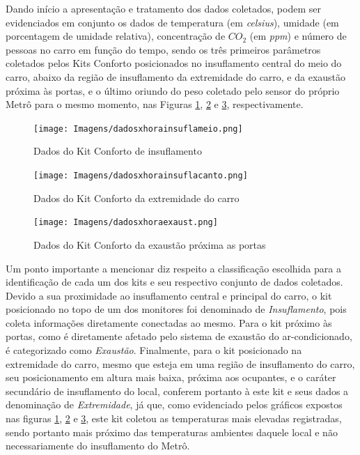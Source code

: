 \documentclass[acronym,symbols,table]{fei}
\begin{document}
Dando início a apresentação e tratamento dos dados coletados, podem ser evidenciados em conjunto os dados de temperatura (em \textit{celsius}), umidade (em porcentagem de umidade relativa), concentração de ${CO}_{2}$ (em \textit{ppm}) e número de pessoas no carro em função do tempo, sendo os três primeiros parâmetros coletados pelos Kits Conforto posicionados no insuflamento central do meio do carro, abaixo da região de insuflamento da extremidade do carro, e da exaustão próxima às portas, e o último oriundo do peso coletado pelo sensor do próprio Metrô para o mesmo momento, nas Figuras \ref{fig:dadosTV}, \ref{fig:dadosjanela} e \ref{fig:dadosporta}, respectivamente.

\begin{figure}[!htb]
    \centering
    \caption{Dados do Kit Conforto de insuflamento}
    \texttt{[image: Imagens/dadosxhorainsuflameio.png]}
    \label{fig:dadosTV}
\end{figure}

\begin{figure}[!htb]
    \centering
    \caption{Dados do Kit Conforto da extremidade do carro}
    \texttt{[image: Imagens/dadosxhorainsuflacanto.png]}
    \label{fig:dadosjanela}
\end{figure}

\begin{figure}[!htb]
    \centering
    \caption{Dados do Kit Conforto da exaustão próxima as portas}
    \texttt{[image: Imagens/dadosxhoraexaust.png]}
    \label{fig:dadosporta}
\end{figure}

\newpage

Um ponto importante a mencionar diz respeito a classificação escolhida para a identificação de cada um dos kits e seu respectivo conjunto de dados coletados. Devido a sua proximidade ao insuflamento central e principal do carro, o kit posicionado no topo de um dos monitores foi denominado de \textit{Insuflamento}, pois coleta informações diretamente conectadas ao mesmo. Para o kit próximo às portas, como é diretamente afetado pelo sistema de exaustão do ar-condicionado, é categorizado como \textit{Exaustão}. Finalmente, para o kit posicionado na extremidade do carro, mesmo que esteja em uma região de insuflamento do carro, seu posicionamento em altura mais baixa, próxima aos ocupantes, e o caráter secundário de insuflamento do local, conferem portanto à este kit e seus dados a denominação de \textit{Extremidade}, já que, como evidenciado pelos gráficos expostos nas figuras \ref{fig:dadosTV}, \ref{fig:dadosjanela} e \ref{fig:dadosporta}, este kit coletou as temperaturas mais elevadas registradas, sendo portanto mais próximo das temperaturas ambientes daquele local e não necessariamente do insuflamento do Metrô.
\end{document}
